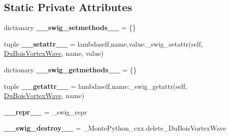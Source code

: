 \subsection*{Static Private Attributes}
\begin{DoxyCompactItemize}
\item 
\hypertarget{classMontePython__cxx_1_1DuBoisVortexWave_a6c62fd054ed29f57836a81859e349e59}{}dictionary {\bfseries \+\_\+\+\_\+swig\+\_\+setmethods\+\_\+\+\_\+} = \{\}\label{classMontePython__cxx_1_1DuBoisVortexWave_a6c62fd054ed29f57836a81859e349e59}

\item 
\hypertarget{classMontePython__cxx_1_1DuBoisVortexWave_a523f89ac79561d337d9a6c94de2e6d5c}{}tuple {\bfseries \+\_\+\+\_\+setattr\+\_\+\+\_\+} = lambdaself,name,value\+:\+\_\+swig\+\_\+setattr(self, \hyperlink{classMontePython__cxx_1_1DuBoisVortexWave}{Du\+Bois\+Vortex\+Wave}, name, value)\label{classMontePython__cxx_1_1DuBoisVortexWave_a523f89ac79561d337d9a6c94de2e6d5c}

\item 
\hypertarget{classMontePython__cxx_1_1DuBoisVortexWave_aee927f6b24ebe352c67c2f3c5347c16c}{}dictionary {\bfseries \+\_\+\+\_\+swig\+\_\+getmethods\+\_\+\+\_\+} = \{\}\label{classMontePython__cxx_1_1DuBoisVortexWave_aee927f6b24ebe352c67c2f3c5347c16c}

\item 
\hypertarget{classMontePython__cxx_1_1DuBoisVortexWave_a385469e58fb4683e8f75ff3c5a1a4537}{}tuple {\bfseries \+\_\+\+\_\+getattr\+\_\+\+\_\+} = lambdaself,name\+:\+\_\+swig\+\_\+getattr(self, \hyperlink{classMontePython__cxx_1_1DuBoisVortexWave}{Du\+Bois\+Vortex\+Wave}, name)\label{classMontePython__cxx_1_1DuBoisVortexWave_a385469e58fb4683e8f75ff3c5a1a4537}

\item 
\hypertarget{classMontePython__cxx_1_1DuBoisVortexWave_a16c8b8f4e8d7f8cdbd9931a7593154dc}{}{\bfseries \+\_\+\+\_\+repr\+\_\+\+\_\+} = \+\_\+swig\+\_\+repr\label{classMontePython__cxx_1_1DuBoisVortexWave_a16c8b8f4e8d7f8cdbd9931a7593154dc}

\item 
\hypertarget{classMontePython__cxx_1_1DuBoisVortexWave_ae8f11b9ac8369695c12053a708075d31}{}{\bfseries \+\_\+\+\_\+swig\+\_\+destroy\+\_\+\+\_\+} = \+\_\+\+Monte\+Python\+\_\+cxx.\+delete\+\_\+\+Du\+Bois\+Vortex\+Wave\label{classMontePython__cxx_1_1DuBoisVortexWave_ae8f11b9ac8369695c12053a708075d31}

\end{DoxyCompactItemize}


